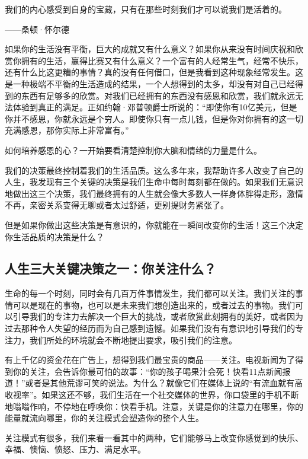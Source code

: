 \begin{BookQuote}
我们的内心感受到自身的宝藏，只有在那些时刻我们才可以说我们是活着的。

\hfill ——桑顿·怀尔德
\end{BookQuote}

如果你的生活没有平衡，巨大的成就又有什么意义？如果你从来没有时间庆祝和欣赏你拥有的生活，赢得比赛又有什么意义？一个富有的人经常生气，经常不快乐，还有什么比这更糟的事情？真的没有任何借口，但是我看到这种现象经常发生。这是一种极端不平衡的生活造成的结果，一个人想得到的太多，却没有对自己已经得到的东西有足够多的欣赏。对我们已经拥有的东西没有感恩和欣赏，我们就永远无法体验到真正的满足。正如约翰·邓普顿爵士所说的：“即使你有10亿美元，但是你并不感恩，你就永远是个穷人。即使你只有一点儿钱，但是你对你拥有的这一切充满感恩，那你实际上非常富有。”

如何培养感恩的心？一开始要看清楚控制你大脑和情绪的力量是什么。

我们的决策最终控制着我们的生活品质。这么多年来，我帮助许多人改变了自己的人生，我发现有三个关键的决策是我们生命中每时每刻都在做的。如果我们无意识地做出这三个决策，我们最终拥有的人生就会像大多数人一样身体胖得走形，激情不再，亲密关系变得无聊或者太过舒适，更别提财务紧张了。

但是如果你做出这些决策是有意识的，你就能在一瞬间改变你的生活！这三个决定你生活品质的决策是什么？

\subsection{人生三大关键决策之一：你关注什么？}

生命的每一个时刻，同时会有几百万件事情发生，我们都可以关注。我们关注的事情可以是现在的事物，也可以是未来我们想创造出来的，或者过去的事物。我们可以引导我们的专注力去解决一个巨大的挑战，或者欣赏此刻拥有的美好，或者因为过去那种令人失望的经历而为自己感到遗憾。如果我们没有有意识地引导我们的专注力，我们所处的环境就会不断地提出要求，吸引我们的注意。

有上千亿的资金花在广告上，想得到我们最宝贵的商品——关注。电视新闻为了得到你的关注，会告诉你最可怕的故事：“你的孩子喝果汁会死！快看11点新闻报道！”或者是其他荒谬可笑的说法。为什么？就像它们在媒体上说的“有流血就有高收视率”。如果这还不够，我们生活在一个社交媒体的世界，你口袋里的手机不断地嗡嗡作响，不停地在呼唤你：快看手机。注意，关键是你的注意力在哪里，你的能量就流向哪里，你的关注模式会塑造你的整个人生。

关注模式有很多，我们来看一看其中的两种，它们能够马上改变你感觉到的快乐、幸福、懊恼、愤怒、压力、满足水平。

